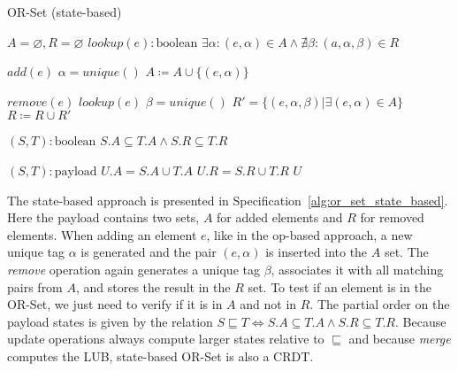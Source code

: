 \begin{algorithm}[t]
\small{
	\caption{OR-Set (state-based)}
 	\label{alg:or_set_state_based}                       

 	\begin{algorithmic}[1]
 	  \State \Payload $A = \varnothing, R = \varnothing$
 	  \State \Query $lookup(e) : \text{boolean}$
 	  \State \hspace{\algorithmicindent} \Return $\exists \alpha : (e, \alpha) \in A \land \nexists \beta : (a, \alpha, \beta) \in R$
 	  
 	  \State \Update $add(e)$
 	  \State \hspace{\algorithmicindent} \Let $\alpha = unique()$
 	  \State \hspace{\algorithmicindent} $A \coloneqq A \cup \{(e, \alpha)\}$
 	  
 	  \State \Update $remove(e)$
 	  \State \hspace{\algorithmicindent} \Pre $lookup(e)$
 	  \State \hspace{\algorithmicindent} \Let $\beta = unique()$
 	  \State \hspace{\algorithmicindent} \Let $R' = \{(e, \alpha, \beta) | \exists (e, \alpha) \in A\}$
 	  \State \hspace{\algorithmicindent} $R \coloneqq R \cup R'$
 	  
 	  \State \Compare $(S, T) : \text{boolean}$
 	  \State \hspace{\algorithmicindent} \Return $S.A \subseteq T.A \land S.R \subseteq T.R$ 
 	  
 	  \State \Merge $(S, T) : \text{payload}$
 	  \State \hspace{\algorithmicindent} \Let $U.A = S.A \cup T.A$
 	  \State \hspace{\algorithmicindent} \Let $U.R = S.R \cup T.R$
 	  \State \hspace{\algorithmicindent} \Return $U$
	\end{algorithmic}
 }
\end{algorithm}

The state-based approach is presented in
Specification~\ref{alg:or_set_state_based}. Here the payload contains two
sets, $A$ for added elements and $R$ for removed elements. When adding an
element $e$, like in the op-based approach, a new unique tag $\alpha$ is
generated and the pair $(e, \alpha)$ is inserted into the $A$ set. The
\textit{remove} operation again generates a unique tag $\beta$, associates it
with all matching pairs from $A$, and stores the result in the $R$ set. To test
if an element is in the OR-Set, we just need to verify if it is in $A$ and not
in $R$. The partial order on the payload states is given by the relation $S
\sqsubseteq T \iff S.A \subseteq T.A \land S.R \subseteq T.R$. Because update
operations always compute larger states relative to $\sqsubseteq$ and because
\textit{merge} computes the LUB, state-based OR-Set is also a CRDT.


